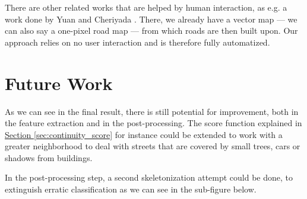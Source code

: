 \documentclass[10pt,conference,compsocconf]{IEEEtran}
\newcommand{\secref}[1]{\hyperref[#1]{Section \ref*{#1}}}
\begin{document}
There are other related works that are helped by human interaction, as e.g. a work done by Yuan and Cheriyada \cite{YuCh13}. There, we already have a vector map --- we can also say a one-pixel road map --- from which roads are then built upon. Our approach relies on no user interaction and is therefore fully automatized.

\section{Future Work}
\label{sec:future_work}

As we can see in the final result, there is still potential for improvement, both in the feature extraction and in the post-processing. The score function explained in \secref{sec:continuity_score} for instance could be extended to work with a greater neighborhood to deal with streets that are covered by small trees, cars or shadows from buildings.

In the post-processing step, a second skeletonization attempt could be done, to extinguish erratic classification as we can see in the sub-figure  below.
\end{document}
